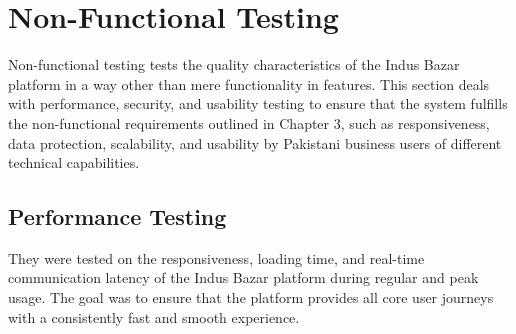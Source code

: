 \newpage
\section{Non-Functional Testing}
Non-functional testing tests the quality characteristics of the Indus Bazar platform in a way other than mere functionality in features. This section deals with performance, security, and usability testing to ensure that the system fulfills the non-functional requirements outlined in Chapter 3, such as responsiveness, data protection, scalability, and usability by Pakistani business users of different technical capabilities.
\subsection{Performance Testing}
They were tested on the responsiveness, loading time, and real-time communication latency of the Indus Bazar platform during regular and peak usage. The goal was to ensure that the platform provides all core user journeys with a consistently fast and smooth experience.

